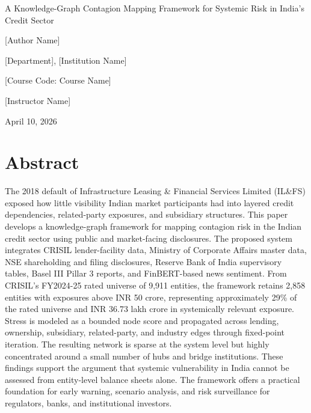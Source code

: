 \documentclass[12pt]{article}
\begin{document}
\begin{titlepage}
\thispagestyle{empty}
\begin{center}
\vspace*{1.75in}
{\Large A Knowledge-Graph Contagion Mapping Framework for Systemic Risk in India's Credit Sector\par}
\vspace{1.5in}
{[Author Name]\par}
\vspace{0.25in}
{[Department], [Institution Name]\par}
\vspace{0.25in}
{[Course Code: Course Name]\par}
\vspace{0.25in}
{[Instructor Name]\par}
\vspace{0.25in}
{April 10, 2026\par}
\end{center}
\end{titlepage}

\section*{Abstract}

The 2018 default of Infrastructure Leasing \& Financial Services Limited (IL\&FS) exposed how little visibility Indian market participants had into layered credit dependencies, related-party exposures, and subsidiary structures. This paper develops a knowledge-graph framework for mapping contagion risk in the Indian credit sector using public and market-facing disclosures. The proposed system integrates CRISIL lender-facility data, Ministry of Corporate Affairs master data, NSE shareholding and filing disclosures, Reserve Bank of India supervisory tables, Basel III Pillar 3 reports, and FinBERT-based news sentiment. From CRISIL's FY2024-25 rated universe of 9,911 entities, the framework retains 2,858 entities with exposures above INR 50 crore, representing approximately 29\% of the rated universe and INR 36.73 lakh crore in systemically relevant exposure. Stress is modeled as a bounded node score and propagated across lending, ownership, subsidiary, related-party, and industry edges through fixed-point iteration. The resulting network is sparse at the system level but highly concentrated around a small number of hubs and bridge institutions. These findings support the argument that systemic vulnerability in India cannot be assessed from entity-level balance sheets alone. The framework offers a practical foundation for early warning, scenario analysis, and risk surveillance for regulators, banks, and institutional investors.
\end{document}
